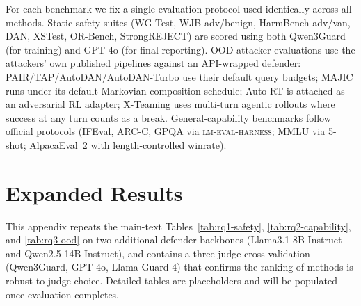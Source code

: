 For each benchmark we fix a single evaluation protocol used identically across all methods. Static safety suites (WG-Test, WJB adv/benign, HarmBench adv/van, DAN, XSTest, OR-Bench, StrongREJECT) are scored using both Qwen3Guard (for training) and GPT-4o (for final reporting). OOD attacker evaluations use the attackers' own published pipelines against an API-wrapped defender: PAIR/TAP/AutoDAN/AutoDAN-Turbo use their default query budgets; MAJIC runs under its default Markovian composition schedule; Auto-RT is attached as an adversarial RL adapter; X-Teaming uses multi-turn agentic rollouts where success at any turn counts as a break. General-capability benchmarks follow official protocols (IFEval, ARC-C, GPQA via \textsc{lm-eval-harness}; MMLU via 5-shot; AlpacaEval~2 with length-controlled winrate).

\section{Expanded Results}
\label{apdx:expanded-results}

This appendix repeats the main-text Tables~\ref{tab:rq1-safety}, \ref{tab:rq2-capability}, and \ref{tab:rq3-ood} on two additional defender backbones (Llama3.1-8B-Instruct and Qwen2.5-14B-Instruct), and contains a three-judge cross-validation (Qwen3Guard, GPT-4o, Llama-Guard-4) that confirms the ranking of methods is robust to judge choice. Detailed tables are placeholders and will be populated once evaluation completes.

